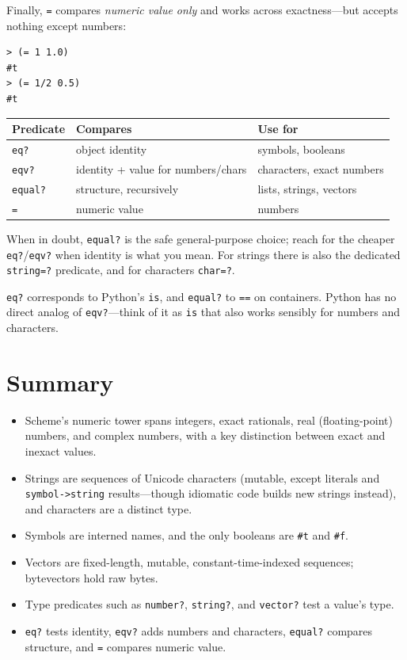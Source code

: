 Finally, \texttt{=} compares \emph{numeric value only} and works across exactness---but accepts nothing except numbers:

\begin{lstlisting}[style=repl]
> (= 1 1.0)
#t
> (= 1/2 0.5)
#t
\end{lstlisting}

\begin{center}
\begin{tabular}{llp{3.2cm}}
\textbf{Predicate} & \textbf{Compares} & \textbf{Use for} \\
\hline
\texttt{eq?} & object identity & symbols, booleans \\
\texttt{eqv?} & identity + value for numbers/chars & characters, exact numbers \\
\texttt{equal?} & structure, recursively & lists, strings, vectors \\
\texttt{=} & numeric value & numbers \\
\end{tabular}
\end{center}

When in doubt, \texttt{equal?} is the safe general-purpose choice; reach for the cheaper \texttt{eq?}/\texttt{eqv?} when identity is what you mean. For strings there is also the dedicated \texttt{string=?} predicate, and for characters \texttt{char=?}.

\begin{note}
\texttt{eq?} corresponds to Python's \texttt{is}, and \texttt{equal?} to \texttt{==} on containers. Python has no direct analog of \texttt{eqv?}---think of it as \texttt{is} that also works sensibly for numbers and characters.
\end{note}

\section*{Summary}

\begin{itemize}
    \item Scheme's numeric tower spans integers, exact rationals, real (floating-point) numbers, and complex numbers, with a key distinction between exact and inexact values.
    \item Strings are sequences of Unicode characters (mutable, except literals and \texttt{symbol->string} results---though idiomatic code builds new strings instead), and characters are a distinct type.
    \item Symbols are interned names, and the only booleans are \texttt{\#t} and \texttt{\#f}.
    \item Vectors are fixed-length, mutable, constant-time-indexed sequences; bytevectors hold raw bytes.
    \item Type predicates such as \texttt{number?}, \texttt{string?}, and \texttt{vector?} test a value's type.
    \item \texttt{eq?} tests identity, \texttt{eqv?} adds numbers and characters, \texttt{equal?} compares structure, and \texttt{=} compares numeric value.
\end{itemize}

